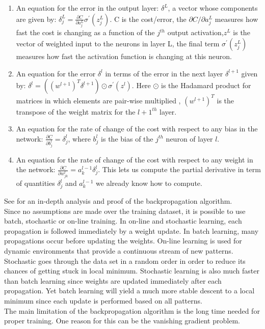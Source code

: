 \documentclass[12pt,oneside]{CUNY_CS_PhD}
\begin{document}
\begin{enumerate}
\item An equation for the error in the output layer: $\delta^L$, a vector whose components are given by:
$\delta^L_j = \frac{\partial C}{\partial a^L_j}\sigma^\prime (z^L_j)$.  C is the cost/error, the $\partial C / \partial a^L_j$ measures how fast the cost is changing as a function of the $j^{th}$ output activation,$z^L$ is the vector of weighted input to the neurons in layer L, the final term $\sigma^\prime (z^L_j)$ measures how fast the activation function is changing at this neuron.
\item An equation for the error $\delta^l$  in terms of the error in the next layer $\delta^{l+1}$ given by:  $\delta^l = ((w^{l+1})^T \delta^{l+1}) \odot \sigma^\prime (z^l)$. Here $\odot$ is the Hadamard product for matrices in which elements are pair-wise multiplied \cite{million2007hadamard}, $(w^{l+1})^T$ is the transpose of the weight matrix for the $l+1^{th}$ layer.
\item An equation for the rate of change of the cost with respect to any bias in the network: $\frac{\partial C}{\partial b^l_j} = \delta^l_j$, where $b^l_j$ is the bias of the $j^{th}$ neuron of layer $l$.
\item An equation for the rate of change of the cost with respect to any weight in the network: $\frac{\partial C}{\partial w^l_{jk}} = a^{l-1}_k \delta^l_j$. This lets us compute the partial derivative in term of quantities $\delta^l_j$ and $a^{l-1}_k$ we already know how to compute.
\end{enumerate}
See \cite{backpropNielsen2014} for an in-depth analysis and proof of the backpropagation algorithm.\\
Since no assumptions are made over the training dataset, it is possible to use batch, stochastic or on-line training. In on-line and stochastic learning, each propagation is followed immediately by a weight update. In batch learning, many propagations occur before updating the weights. On-line learning is used for dynamic environments that provide a continuous stream of new patterns. Stochastic goes through the data set in a random order in order to reduce its chances of getting stuck in local minimum. Stochastic learning is also much faster than batch learning since weights are updated immediately after each propagation. Yet batch learning will yield a much more stable descent to a local minimum since each update is performed based on all patterns.\\
The main limitation of the backpropagation algorithm is the long time needed for proper training. One reason for this can be the vanishing gradient problem.
\end{document}
